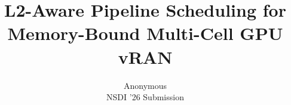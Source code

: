 \documentclass[letterpaper,twocolumn,10pt]{article}
\begin{document}
\date{}

\title{\Large \bf L2-Aware Pipeline Scheduling for Memory-Bound Multi-Cell GPU vRAN}

\author{
{\rm Anonymous}\\
NSDI '26 Submission
} %

\maketitle












{\footnotesize 
}
\end{document}
